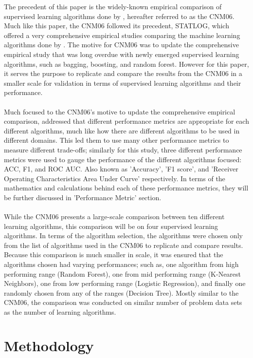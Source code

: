\documentclass[twoside,11pt]{article}
\begin{document}
The precedent of this paper is the widely-known empirical comparison of 
supervised learning algorithms done by \citet{cnm:06}, hereafter referred 
to as the CNM06. Much like this paper, the CNM06 followed its precedent, STATLOG,
which offered a very comprehensive empirical studies comparing the machine
learning algorithms done by \citet{king:95}. The motive for CNM06 was 
to update the comprehensive empirical study that was long overdue with 
newly emerged supervised learning algorithms, such as bagging, boosting,
and random forest. However for this paper, it serves the purpose to 
replicate and compare the results from the CNM06 in a smaller scale 
for validation in terms of supervised learning algorithms and their performance.\\
\\
Much focused to the CNM06's motive to update the comprehensive empirical 
comparison, \citeauthor{cnm:06} addressed that different performance metrics 
are appropriate for each different algorithms, much like how there are different 
algorithms to be used in different domains.  This led them to use many other 
performance metrics to measure different trade-offs; similarly for this study, 
three different performance metrics were used to gauge the performance of the  
different algorithms focused: ACC, F1, and ROC AUC.  Also known as 'Accuracy', 
'F1 score', and 'Receiver Operating Characteristics Area Under Curve' respectively.  
In terms of the mathematics and calculations behind each of these performance 
metrics, they will be further discussed in 'Performance Metric' section.  \\
\\
While the CNM06 presents a large-scale comparison between ten different learning 
algorithms, this comparison will be on four supervised learning algorithms.  
In terms of the algorithm selection, the algorithms were chosen only from the 
list of algorithms used in the CNM06 to replicate and compare results. 
Because this comparison is much smaller in scale, it was ensured that 
the algorithms chosen had varying performances; such as, one algorithm from 
high performing range (Random Forest), one from mid performing range 
(K-Nearest Neighbors), one from low performing range (Logistic Regression), 
and finally one randomly chosen from any of the ranges (Decision Tree). Mostly 
similar to the CNM06, the comparison was conducted on similar number of problem data sets 
as the number of learning algorithms.

\section{Methodology}
\end{document}
